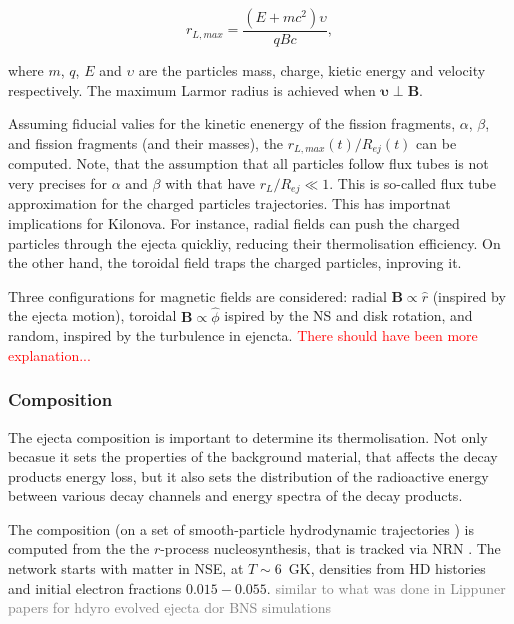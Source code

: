 \documentclass[11pt,a4paper,headinclude=true,DIV=14,BCOR=8mm,chapterprefix,listof=totoc,twoside,openright,abstracton]{scrbook}
\newcommand{\red}[1]{\textcolor{red}{#1}}
\newcommand{\gray}[1]{\textcolor{gray}{#1}}
\begin{document}
\begin{equation}
    r_{L, max} = \frac{(E+mc^2)\upsilon}{qBc},
\end{equation}

where $m$, $q$, $E$ and $\upsilon$ are the particles mass, charge, kietic energy and velocity respectively. The maximum Larmor radius is achieved when $\boldsymbol{\upsilon}\perp\boldsymbol{B}$.

Assuming fiducial valies for the kinetic enenergy of the fission fragments, $\alpha$, $\beta$, and fission fragments (and their masses), the $r_{L,max}(t)/R_{ej}(t)$ can be computed. Note, that the assumption that all particles follow flux tubes is not very precises for $\alpha$ and $\beta$ with that have $r_L/R_{ej}\ll 1$.
This is so-called flux tube approximation for the charged particles trajectories. 
This has importnat implications for Kilonova. For instance, radial fields can push the charged particles through the ejecta quickliy, reducing their thermolisation efficiency. On the other hand, the toroidal field traps the charged particles, inproving it. 

Three configurations for magnetic fields are considered: radial $\boldsymbol{B}\propto\hat{r}$ (inspired by the ejecta motion), toroidal $\boldsymbol{B}\propto\hat{\phi}$ ispired by the NS and disk rotation, and random, inspired by the turbulence in ejencta.
\red{There should have been more explanation...}


\subsubsection{Composition}

The ejecta composition is important to determine its thermolisation. Not only becasue it sets the properties of the background material, that affects the decay products energy loss, but it also sets the distribution of the radioactive energy between various decay channels and energy spectra of the decay products. 

The composition (on a set of smooth-particle hydrodynamic trajectories \cite{(Goriely et al. 2011)}) is computed from the the $r$-process nucleosynthesis, that is tracked via NRN \cite{Mendoza-Temis et al. 2015}. The network starts with matter in NSE, at $T\sim6$~GK, densities from HD histories and initial electron fractions $0.015-0.055$. 
\gray{similar to what was done in Lippuner papers for hdyro evolved ejecta dor BNS simulations}
\end{document}
